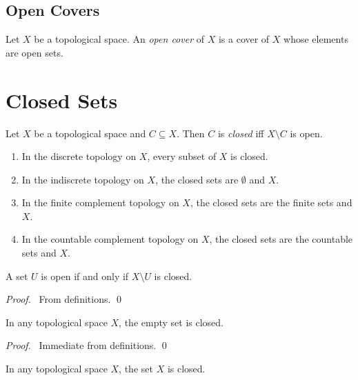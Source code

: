 \subsection{Open Covers}

\begin{df}
  Let $X$ be a topological space. An \emph{open cover} of $X$ is a cover of $X$ whose elements are open sets.
\end{df}

\section{Closed Sets}

\begin{df}
  Let $X$ be a topological space and $C \subseteq X$. Then $C$ is \emph{closed} iff $X \setminus C$ is open.
\end{df}

\begin{ex}
  \begin{enumerate}
    \item In the discrete topology on $X$, every subset of $X$ is closed.
    \item In the indiscrete topology on $X$, the closed sets are $\emptyset$ and $X$.
    \item In the finite complement topology on $X$, the closed sets are the finite sets and $X$.
    \item In the countable complement topology on $X$, the closed sets are the countable sets and $X$.
  \end{enumerate}
\end{ex}

\begin{prop}
  A set $U$ is open if and only if $X \setminus U$ is closed.
\end{prop}

\begin{proof}
  \pf\ From definitions. \qed
\end{proof}

\begin{prop}
  In any topological space $X$, the empty set is closed.
\end{prop}

\begin{proof}
\pf\ Immediate from definitions. \qed
\end{proof}

\begin{prop}
  In any topological space $X$, the set $X$ is closed.
\end{prop}

